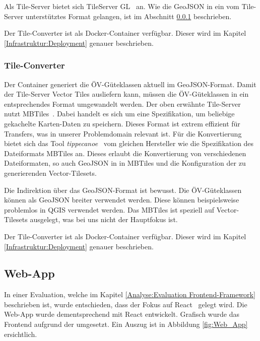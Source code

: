 Als Tile-Server bietet sich TileServer GL~\cite{tile-server-gl} an.
Wie die GeoJSON in ein vom Tile-Server unterstütztes Format gelangen, ist im Abschnitt \ref{Implementation:Tile-Converter} beschrieben.

Der Tile-Converter ist als Docker-Container verfügbar.
Dieser wird im Kapitel \ref{Infrastruktur:Deployment} genauer beschrieben.


\subsubsection{Tile-Converter}
\label{Implementation:Tile-Converter}

Der Container  generiert die \acs{ÖV}-Güteklassen aktuell im GeoJSON-Format.
Damit der Tile-Server Vector Tiles ausliefern kann, müssen die \acs{ÖV}-Güteklassen in ein entsprechendes Format umgewandelt werden.
Der oben erwähnte Tile-Server nutzt MBTiles~\cite{mbtiles}.
Dabei handelt es sich um eine Spezifikation, um beliebige gekachelte Karten-Daten zu speichern.
Dieses Format ist extrem effizient für Transfers, was in unserer Problemdomain relevant ist.
Für die Konvertierung bietet sich das Tool \emph{tippecanoe}~\cite{tippecanoe} vom gleichen Hersteller wie die Spezifikation des Dateiformats MBTiles an.
Dieses erlaubt die Konvertierung von verschiedenen Dateiformaten, so auch GeoJSON in in MBTiles und die Konfiguration der zu generierenden Vector-Tilesets.

Die Indirektion über das GeoJSON-Format ist bewusst.
Die ÖV-Güteklassen können als GeoJSON breiter verwendet werden.
Diese können beispielsweise problemlos in QGIS verwendet werden.
Das MBTiles ist speziell auf Vector-Tilesets ausgelegt, was bei uns nicht der Hauptfokus ist.

Der Tile-Converter ist als Docker-Container verfügbar.
Dieser wird im Kapitel \ref{Infrastruktur:Deployment} genauer beschrieben.

\subsection{Web-App}
\label{Implementation:Web-App}

In einer Evaluation, welche im Kapitel \ref{Analyse:Evaluation Frontend-Framework} beschrieben ist, wurde entschieden, dass der Fokus auf React~\cite{react} gelegt wird.
Die Web-App wurde dementsprechend mit React entwickelt.
Grafisch wurde das Frontend aufgrund der  umgesetzt.
Ein Auszug ist in Abbildung \ref{fig:Web_App} ersichtlich.

